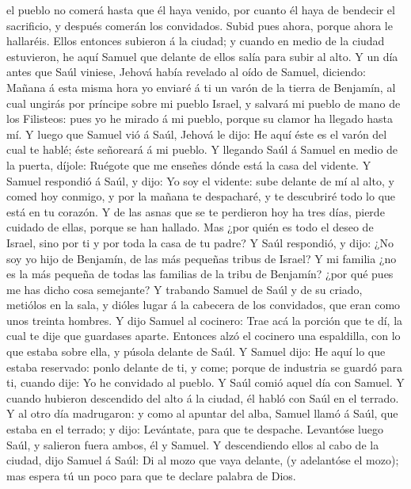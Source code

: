el pueblo no comerá hasta que él haya venido, por cuanto él haya de
bendecir el sacrificio, y después comerán los convidados. Subid pues
ahora, porque ahora le hallaréis.  Ellos entonces
subieron á la ciudad; y cuando en medio de la ciudad estuvieron, he aquí
Samuel que delante de ellos salía para subir al alto.  Y
un día antes que Saúl viniese, Jehová había revelado al oído de Samuel,
diciendo:  Mañana á esta misma hora yo enviaré á ti un
varón de la tierra de Benjamín, al cual ungirás por príncipe sobre mi
pueblo Israel, y salvará mi pueblo de mano de los Filisteos: pues yo he
mirado á mi pueblo, porque su clamor ha llegado hasta mí.
 Y luego que Samuel vió á Saúl, Jehová le dijo: He aquí
éste es el varón del cual te hablé; éste señoreará á mi pueblo.
 Y llegando Saúl á Samuel en medio de la puerta, díjole:
Ruégote que me enseñes dónde está la casa del vidente.  Y
Samuel respondió á Saúl, y dijo: Yo soy el vidente: sube delante de mí
al alto, y comed hoy conmigo, y por la mañana te despacharé, y te
descubriré todo lo que está en tu corazón.  Y de las
asnas que se te perdieron hoy ha tres días, pierde cuidado de ellas,
porque se han hallado. Mas ¿por quién es todo el deseo de Israel, sino
por ti y por toda la casa de tu padre?  Y Saúl respondió,
y dijo: ¿No soy yo hijo de Benjamín, de las más pequeñas tribus de
Israel? Y mi familia ¿no es la más pequeña de todas las familias de la
tribu de Benjamín? ¿por qué pues me has dicho cosa semejante?
 Y trabando Samuel de Saúl y de su criado, metiólos en la
sala, y dióles lugar á la cabecera de los convidados, que eran como unos
treinta hombres.  Y dijo Samuel al cocinero: Trae acá la
porción que te dí, la cual te dije que guardases aparte. 
Entonces alzó el cocinero una espaldilla, con lo que estaba sobre ella,
y púsola delante de Saúl. Y Samuel dijo: He aquí lo que estaba
reservado: ponlo delante de ti, y come; porque de industria se guardó
para ti, cuando dije: Yo he convidado al pueblo. Y Saúl comió aquel día
con Samuel.  Y cuando hubieron descendido del alto á la
ciudad, él habló con Saúl en el terrado.  Y al otro día
madrugaron: y como al apuntar del alba, Samuel llamó á Saúl, que estaba
en el terrado; y dijo: Levántate, para que te despache. Levantóse luego
Saúl, y salieron fuera ambos, él y Samuel.  Y
descendiendo ellos al cabo de la ciudad, dijo Samuel á Saúl: Di al mozo
que vaya delante, (y adelantóse el mozo); mas espera tú un poco para que
te declare palabra de Dios.

